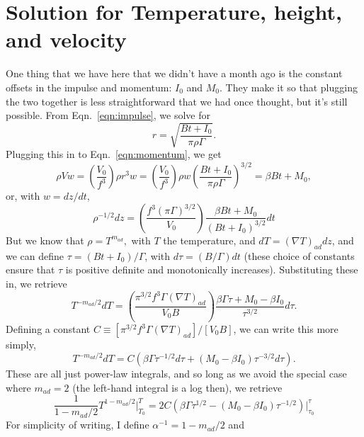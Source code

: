 \documentclass[onecolumn, amsmath, amsfonts, amssymb]{aastex62}
\newcommand{\grad}{\ensuremath{\nabla}}
\begin{document}
\section{Solution for Temperature, height, and velocity}
One thing that we have here that we didn't have a month ago is the constant offsets in
the impulse and momentum: $I_0$ and $M_0$.  They make it so that plugging the two together
is less straightforward that we had once thought, but it's still possible. From 
Eqn.~\ref{eqn:impulse}, we solve for
\begin{equation}
r = \sqrt{\frac{B t + I_0}{\pi\rho\Gamma}}.
\end{equation}
Plugging this in to Eqn.~\ref{eqn:momentum}, we get
\begin{equation}
\rho V w = \left(\frac{V_0}{f^3}\right)\rho r^3 w
= \left(\frac{V_0}{f^3}\right)\rho w \left(\frac{B t + I_0}{\pi\rho\Gamma}\right)^{3/2} = \beta Bt + M_0,
\end{equation}
or, with $w = dz/dt$,
\begin{equation}
\rho^{-1/2}dz = \left(\frac{f^3 (\pi\Gamma)^{3/2}}{V_0}\right)\frac{\beta Bt + M_0}{(Bt + I_0)^{3/2}}dt
\end{equation}
But we know that $\rho = T^{m_{ad}},$ with $T$ the temperature, and $dT = (\grad T)_{ad} dz$,
and we can define $\tau = (Bt + I_0)/\Gamma$, with $d\tau = (B/\Gamma) dt$ (these choice of constants
ensure that $\tau$ is positive definite and monotonically increases). Substituting these in, we retrieve
\begin{equation}
T^{-m_{ad}/2}dT 
= \left(\frac{\pi^{3/2}f^3 \Gamma(\grad T)_{ad}}{V_0 B}\right)\frac{\beta\Gamma \tau + M_0 - \beta I_0}{\tau^{3/2}}d\tau.
\end{equation}
Defining a constant $C \equiv [\pi^{3/2} f^3 \Gamma(\grad T)_{ad}]/[V_0 B]$, we can write this more simply,
\begin{equation}
T^{-m_{ad}/2}dT = C\left(\beta \Gamma\tau^{-1/2}d\tau + (M_0 - \beta I_0)\tau^{-3/2}d\tau\right).
\label{eqn:integrand}
\end{equation}
These are all just power-law integrals, and so long as
we avoid the special case where $m_{ad} = 2$ (the left-hand integral is a log then), we retrieve
\begin{equation}
\frac{1}{1 - m_{ad}/2} T^{1 - m_{ad}/2}\bigg|_{T_0}^{T} 
= 2C\left(\beta\Gamma \tau^{1/2} - (M_0 - \beta I_0)\tau^{-1/2}\right)\bigg|_{\tau_0}^{\tau}
\end{equation}
For simplicity of writing, I define $\alpha^{-1} =  1 - m_{ad}/2$ and 
\end{document}
